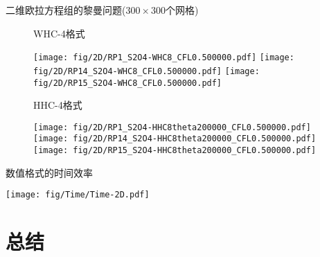 \documentclass[aspectratio=169]{beamer}
\begin{document}
\begin{frame}{二维欧拉方程组的黎曼问题($300 \times 300$个网格)}
  
  \vspace{-4mm}
  \begin{figure}[htbp]
    \centering
    
    \begin{multicols}{4}
      \begin{minipage}{0.25\textwidth}
        \vspace{0.13\textheight}
        \centerline{WHC-4格式}
      \end{minipage}
      \texttt{[image: fig/2D/RP1\_S2O4-WHC8\_CFL0.500000.pdf]}
      \texttt{[image: fig/2D/RP14\_S2O4-WHC8\_CFL0.500000.pdf]}
      \texttt{[image: fig/2D/RP15\_S2O4-WHC8\_CFL0.500000.pdf]}
    \end{multicols}
    
    \begin{multicols}{4}
      \begin{minipage}{0.25\textwidth}
        \vspace{0.1\textheight}
        \centerline{HHC-4格式}
      \end{minipage}
      \texttt{[image: fig/2D/RP1\_S2O4-HHC8theta200000\_CFL0.500000.pdf]}
      \texttt{[image: fig/2D/RP14\_S2O4-HHC8theta200000\_CFL0.500000.pdf]}
      \texttt{[image: fig/2D/RP15\_S2O4-HHC8theta200000\_CFL0.500000.pdf]}
    \end{multicols}
  \end{figure}
  
\end{frame}

\begin{frame}{数值格式的时间效率}
  
  \centering
  \texttt{[image: fig/Time/Time-2D.pdf]}
  
\end{frame}

\section{总结}
\end{document}
